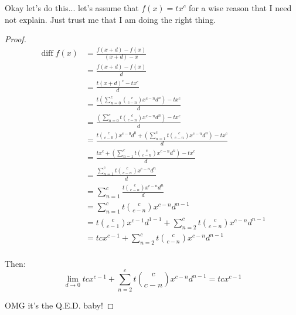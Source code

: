 \documentclass{report}
\DeclareMathOperator{\diff}{diff}
\begin{document}
Okay let's do this... let's assume that $f(x) = tx^c$ for a wise reason that I
need not explain. Just trust me that I am doing the right thing.
\begin{proof}
    \[\begin{split}
        \diff f(x) &= \frac{f(x+d) - f(x)}{(x+d)-x}\\
                   &= \frac{f(x+d) - f(x)}{d}\\
                   &= \frac{t(x+d)^c - tx^c}{d}\\
                   &= \frac{t(\sum_{n=0}^c {c \choose c-n}x^{c-n}d^n) - tx^c}{d}\\
                   &= \frac{(\sum_{n=0}^c t {c \choose c-n}x^{c-n}d^n) - tx^c}{d}\\
                   &= \frac{t {c \choose c-0}x^{c-0}d^0 + (\sum_{n=1}^c t {c \choose c-n}x^{c-n}d^n) - tx^c}{d}\\
                   &= \frac{tx^{c} + (\sum_{n=1}^c t {c \choose c-n}x^{c-n}d^n) - tx^c}{d}\\
                   &= \frac{\sum_{n=1}^c t {c \choose c-n}x^{c-n}d^n}{d}\\
                   &= \sum_{n=1}^c \frac{t {c \choose c-n}x^{c-n}d^n}{d}\\
                   &= \sum_{n=1}^c t {c \choose c-n}x^{c-n}d^{n-1}\\
                   &= t {c \choose c-1}x^{c-1}d^{1-1} + \sum_{n=2}^c t {c \choose c-n}x^{c-n}d^{n-1}\\
                   &= tcx^{c-1} + \sum_{n=2}^c t {c \choose c-n}x^{c-n}d^{n-1}\\
    \end{split}\]

    Then:
    \[\lim_{d \rightarrow 0} tcx^{c-1} + \sum_{n=2}^c t {c \choose
    c-n}x^{c-n}d^{n-1} = tcx^{c-1}\]

    OMG it's the Q.E.D. baby!
\end{proof}
\end{document}
